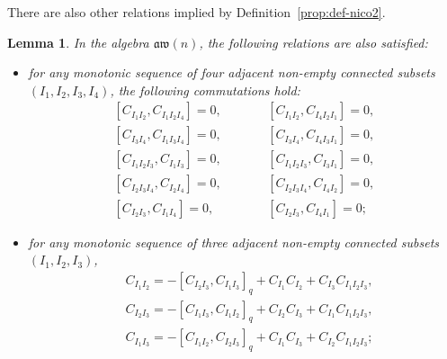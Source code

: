 \documentclass[10pt,a4paper]{amsart}
\numberwithin{equation}{section}
\newtheorem{lemm}[theo]{Lemma}
\theoremstyle{definition}
\newcommand{\aw}{\mathfrak{aw}(n)}
\begin{document}
There are also other relations implied by Definition~\ref{prop:def-nico2}.
\begin{lemm}\label{prop:def-nico}
In the algebra $\aw$, the following relations are also satisfied:
\begin{itemize}\itemsep=0pt
\item for any monotonic sequence of four adjacent non-empty connected subsets $(I_1,I_2,I_3,I_4)$, the following commutations hold:
\begin{subequations}\label{rel:com}
\begin{alignat}{3}
 & [C_{I_1I_2}, C_{I_1I_2I_4} ]=0 ,\qquad&& [C_{I_1I_2}, C_{I_4I_2I_1} ]=0 ,&\label{rel:com1}\\
 & [C_{I_3I_4}, C_{I_1I_3I_4} ]=0 ,\qquad&& [C_{I_3I_4}, C_{I_4I_3I_1} ]=0 ,&\nonumber\\ %
 & [C_{I_1I_2I_3}, C_{I_1I_3}]=0 ,\qquad&& [C_{I_1I_2I_3}, C_{I_3I_1}]=0 ,&\nonumber\\ %
 & [C_{I_2I_3I_4}, C_{I_2I_4}]=0 ,\qquad&& [C_{I_2I_3I_4}, C_{I_4I_2}]=0 ,&\nonumber\\ %
 & [C_{I_2I_3}, C_{I_1I_4} ]=0 ,\qquad&& [C_{I_2I_3}, C_{I_4I_1} ]=0 ;&\nonumber %
\end{alignat}
\end{subequations}

\item for any monotonic sequence of three adjacent non-empty connected subsets $(I_1,I_2,I_3)$,
\begin{subequations}\label{relaw3}
\begin{align}
 & C_{I_1I_2}=-[C_{I_2I_3},C_{I_1I_3}]_q+C_{I_1}C_{I_2}+C_{I_3}C_{I_1I_2I_3} , \label{relaw31}\\
 & C_{I_2I_3}=-[C_{I_1I_3},C_{I_1I_2}]_q+C_{I_2}C_{I_3}+C_{I_1}C_{I_1I_2I_3}, \label{relaw32}\\
&C_{I_1I_3}=-[C_{I_1I_2},C_{I_2I_3}]_q+C_{I_1}C_{I_3}+C_{I_2}C_{I_1I_2I_3}\label{relaw33};
\end{align}
\end{subequations}



\end{itemize}
\end{lemm}
\end{document}
